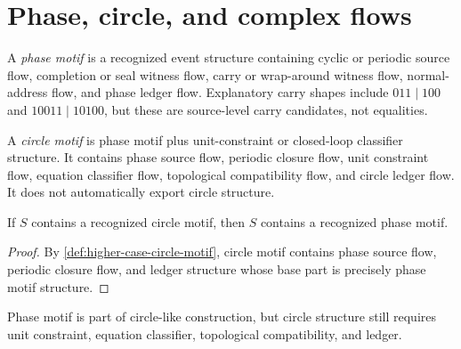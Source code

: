 \section{Phase, circle, and complex flows}
\label{sec:higher-case-phase-circle-complex}

\begin{definition}
\label{def:higher-case-phase-motif}
A \emph{phase motif} is a recognized event structure containing cyclic or periodic source flow, completion or seal witness flow, carry or wrap-around witness flow, normal-address flow, and phase ledger flow. Explanatory carry shapes include $011\mid 100$ and $10011\mid 10100$, but these are source-level carry candidates, not equalities.
\end{definition}

\begin{definition}
\label{def:higher-case-circle-motif}
A \emph{circle motif} is phase motif plus unit-constraint or closed-loop classifier structure. It contains phase source flow, periodic closure flow, unit constraint flow, equation classifier flow, topological compatibility flow, and circle ledger flow. It does not automatically export circle structure.
\end{definition}

\begin{proposition}
\label{prop:higher-case-circle-extends-phase}
If $S$ contains a recognized circle motif, then $S$ contains a recognized phase motif.
\end{proposition}

\begin{proof}
By \autoref{def:higher-case-circle-motif}, circle motif contains phase source flow, periodic closure flow, and ledger structure whose base part is precisely phase motif structure.
\end{proof}

\begin{corollary}
\label{cor:higher-case-phase-necessary-not-sufficient-circle}
Phase motif is part of circle-like construction, but circle structure still requires unit constraint, equation classifier, topological compatibility, and ledger.
\end{corollary}

